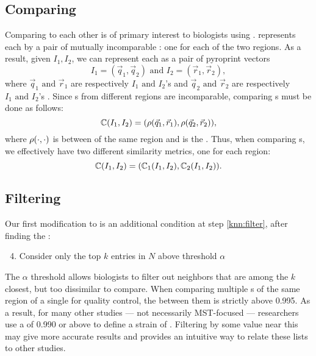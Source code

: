 \subsection{Comparing \Isols{}}
Comparing \isols{} to each other is of primary interest to biologists using \cplop{}.
\cplop{} represents each \isol{} by a pair of mutually incomparable \pyros{}: one for each of the two \itsshort{} regions.
As a result, given \isols{} $I_1, I_2$, we can represent each as a pair of pyroprint vectors 
\[I_1 = (\vec{q}_1, \vec{q}_2) \text{ and } I_2 = (\vec{r}_1, \vec{r}_2),
\]
where $\vec{q}_1 \text{ and } \vec{r}_1$ are respectively $I_1 \text{ and } I_2$'s \Ssixt{} \pyro{} and $\vec{q}_2 \text{ and } \vec{r}_2$ are respectively $I_1 \text{ and } I_2$'s \Sfive{} \pyro{} \cite{Black2014121}. Since \pyro{}s from different regions are incomparable, comparing \isol{}s must be done as follows:
\[
\mathbb{C}{}(I_1, I_2) = (\rho(\vec{q}_1, \vec{r}_1), \rho(\vec{q}_2, \vec{r}_2)),
\]
where $\rho(\cdot,\cdot)$ is between \pyros{} of the same \itsshort{} region and is the \pearson{}. Thus, when comparing \isol{}s, we effectively have two different similarity metrics, one for each \itsshort{} region:
\[
\mathbb{C}{}(I_1, I_2) = (\mathbb{C}_{1}{}(I_1, I_2), \mathbb{C}_{2}{}(I_1, I_2)).
\]



\subsection{\a{} Filtering}
Our first modification to \kNN{} is an additional condition at step \ref{knn:filter}, after finding the \knnlong{}:
\begin{enumerate}
\setcounter{enumi}{3}
\item Consider only the top $k$ entries in $N$ above threshold $\alpha$
\end{enumerate}
The $\alpha$ threshold allows biologists to filter out neighbors that are among the $k$ closest, but too dissimilar to compare. 
When comparing multiple \pyro{}s of the same region of a single \isol{} for quality control, the \pearson{} between them is strictly above 0.995.
As a result, for many other studies --- not necessarily MST-focused --- \cplop{} researchers use a \pearson{} of 0.990 or above to define a strain of \ecoli{}.
Filtering by some value near this may give more accurate results and provides an intuitive way to relate these lists to other studies.

